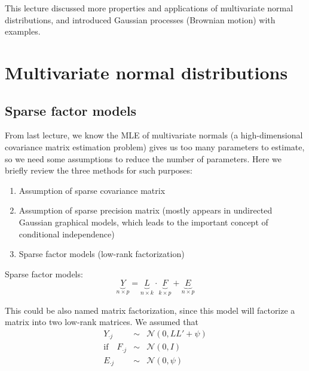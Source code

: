 \documentclass[12pt]{report}
\begin{document}

\maketitle

\vspace*{.2in}

This lecture discussed more properties and applications of multivariate normal distributions, and introduced Gaussian processes (Brownian motion) with examples.

\section{Multivariate normal distributions}

\subsection{Sparse factor models}

From last lecture, we know the MLE of multivariate normals (a high-dimensional covariance matrix estimation problem) gives us too many parameters to estimate, so we need some assumptions to reduce the number of parameters. Here we briefly review the three methods for such purposes:

\begin{enumerate}
	\item Assumption of sparse covariance matrix
	\item Assumption of sparse precision matrix (mostly appears in undirected Gaussian graphical models, which leads to the important concept of conditional independence)
	\item Sparse factor models (low-rank factorization)
\end{enumerate}

Sparse factor models:
\begin{equation}
\underbrace{Y}_{n \times p} = \underbrace{L}_{n \times k} \cdot \underbrace{F}_{k \times p} + \underbrace{E}_{n \times p}
\end{equation}

This could be also named matrix factorization, since this model will factorize a matrix into two low-rank matrices.
We assumed that
\begin{eqnarray}
	Y_{\cdot j} & \sim & \mathcal{N}(0, LL' + \psi) \\
    \text{if} \quad F_{\cdot j} & \sim & \mathcal{N}(0, I)\\
    E_{\cdot j} & \sim & \mathcal{N}(0, \psi)
\end{eqnarray}
\end{document}
